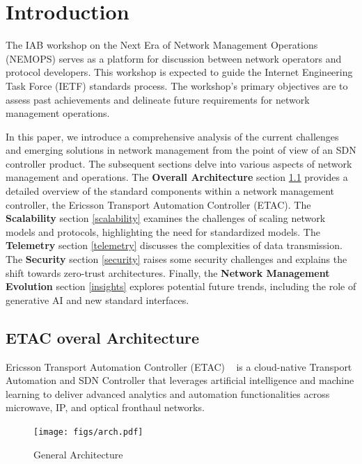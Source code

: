 \documentclass[11pt,sigconf]{iabart}
\begin{document}
\section{Introduction} \label{introduction}

The IAB workshop on the Next Era of Network Management Operations (NEMOPS) serves as a platform for discussion between network operators and protocol developers. This workshop is expected to guide the Internet Engineering Task Force (IETF) standards process. The workshop's primary objectives are to assess past achievements and delineate future requirements for network management operations.

In this paper, we introduce a comprehensive analysis of the current challenges and emerging solutions in network management from the point of view of an SDN controller product. The subsequent sections delve into various aspects of network management and operations. The \textbf{Overall Architecture} section \ref{overview} provides a detailed overview of the standard components within a network management controller, the Ericsson Transport Automation Controller (ETAC). The \textbf{Scalability} section \ref{scalability} examines the challenges of scaling network models and protocols, highlighting the need for standardized models. The \textbf{Telemetry} section \ref{telemetry} discusses the complexities of data transmission. The \textbf{Security} section \ref{security} raises some security challenges and explains the shift towards zero-trust architectures. Finally, the \textbf{Network Management Evolution} section \ref{insights} explores potential future trends, including the role of generative AI and new standard interfaces.

\subsection{ETAC overal Architecture} \label{overview}

Ericsson Transport Automation Controller (ETAC) ~\cite{ericsson-etac} is a cloud-native Transport Automation and SDN Controller that leverages artificial intelligence and machine learning to deliver advanced analytics and automation functionalities across microwave, IP, and optical fronthaul networks.

\begin{figure}[h]
  \centering
  \texttt{[image: figs/arch.pdf]}
  \caption{General Architecture}
  \label{fig:overall_architecture}
\end{figure}
\end{document}
